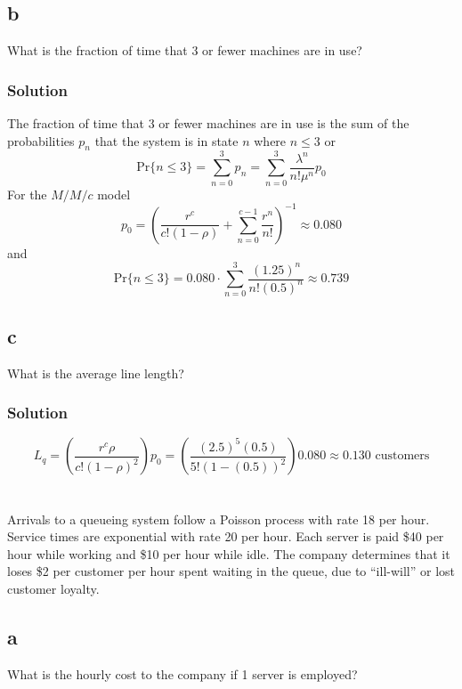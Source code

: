 \documentclass[letterpaper]{amsart}
\begin{document}
\subsection*{b}
What is the fraction of time that 3 or fewer machines are in use?
\subsubsection*{Solution}
The fraction of time that 3 or fewer machines are in use is the sum of the
probabilities $p_n$ that
the system is in state $n$ where $n\leq3$ or
\begin{equation*}
  \text{Pr}\{n\leq3\}=\sum_{n=0}^3p_n=\sum_{n=0}^3\frac{\lambda^n}{n!\mu^n}p_0
\end{equation*}
For the $M/M/c$ model
\begin{equation*}
  p_0=\left( \frac{r^c}{c!(1-\rho)}+\sum_{n=0}^{c-1}\frac{r^n}{n!}\right)^{-1}\approx 0.080
\end{equation*}
and
\begin{equation*}
  \text{Pr}\{n\leq3\}
  = 0.080\cdot\sum_{n=0}^3\frac{(1.25)^n}{n!(0.5)^n}
  \approx 0.739
\end{equation*}
\subsection*{c}
What is the average line length?
\subsubsection*{Solution}
\begin{equation*}
  L_q=\left( \frac{r^c\rho}{c!(1-\rho)^2}\right)p_0
  =\left( \frac{(2.5)^5(0.5)}{5!(1-(0.5))^2}\right)0.080\approx 0.130\text{ customers}
\end{equation*}

\section{} %
Arrivals to a queueing system follow a Poisson process with rate 18 per hour.
Service times are exponential with rate 20 per hour. Each server is paid \$40 per
hour while working and \$10 per hour while idle. The company determines that it
loses \$2 per customer per hour spent waiting in the queue, due to ``ill-will'' or lost
customer loyalty.
\subsection*{a}
What is the hourly cost to the company if 1 server is employed?
\end{document}

